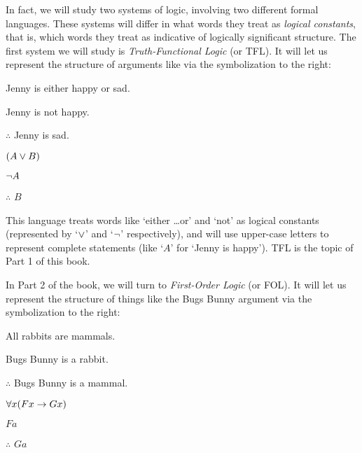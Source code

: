 In fact, we will study two systems of logic, involving two different formal languages. These systems will differ in what words they treat as \emph{logical constants}, that is,  which words they treat as indicative of logically significant structure.  The first system we will study is \emph{Truth-Functional Logic} (or TFL).  It will let us represent the structure of arguments like  via the symbolization to the right:

\begin{multicols}{2}

	\begin{earg}
		\item[\eref{exarg8}] Jenny is either happy or sad.
		\item[] Jenny is not happy.
		\item[] $\therefore$ Jenny is sad.
	\end{earg}

\columnbreak

	\begin{earg}
		\item[] $(A \vee B)$
		\item[] $\neg A$
		\item[] $\therefore$ $B$
	\end{earg}

\end{multicols}

\noindent This language treats words like `either \ldots or' and `not' as logical constants (represented by `$\vee$' and `$\neg$' respectively), and will use upper-case letters to represent complete statements (like `$A$' for `Jenny is happy').  TFL is the topic of Part 1 of this book.

In Part 2 of the book, we will turn to \emph{First-Order Logic} (or FOL).  It will let us represent the structure of things like the Bugs Bunny argument via the symbolization to the right:


\begin{multicols}{2}

\begin{earg}
\item[\eref{exarg1}]All rabbits are mammals.
\item[] Bugs Bunny is a rabbit.
\item[] $\therefore$ Bugs Bunny is a mammal.
\end{earg}

\columnbreak

	\begin{earg}
		\item[] $\forall x(Fx \rightarrow Gx)$
		\item[] $Fa$
		\item[] $\therefore$ $Ga$
	\end{earg}

\end{multicols}

